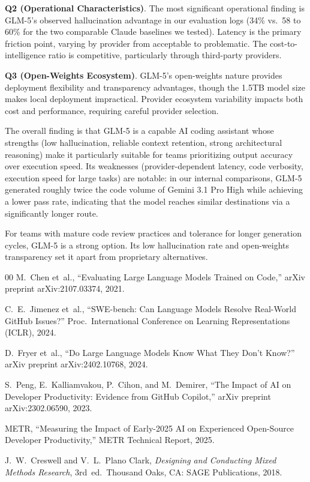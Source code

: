 \documentclass[conference]{IEEEtran}
\begin{document}
\textbf{Q2 (Operational Characteristics)}. The most significant operational finding is GLM-5's observed hallucination advantage in our evaluation logs (34\% vs.\ 58 to 60\% for the two comparable Claude baselines we tested). Latency is the primary friction point, varying by provider from acceptable to problematic. The cost-to-intelligence ratio is competitive, particularly through third-party providers.

\textbf{Q3 (Open-Weights Ecosystem)}. GLM-5's open-weights nature provides deployment flexibility and transparency advantages, though the 1.5TB model size makes local deployment impractical. Provider ecosystem variability impacts both cost and performance, requiring careful provider selection.

The overall finding is that GLM-5 is a capable AI coding assistant whose strengths (low hallucination, reliable context retention, strong architectural reasoning) make it particularly suitable for teams prioritizing output accuracy over execution speed. Its weaknesses (provider-dependent latency, code verbosity, execution speed for large tasks) are notable: in our internal comparisons, GLM-5 generated roughly twice the code volume of Gemini 3.1 Pro High while achieving a lower pass rate, indicating that the model reaches similar destinations via a significantly longer route.

For teams with mature code review practices and tolerance for longer generation cycles, GLM-5 is a strong option. Its low hallucination rate and open-weights transparency set it apart from proprietary alternatives.

\begin{thebibliography}{00}
\setlength{\itemsep}{-2pt}
M.~Chen et~al., ``Evaluating Large Language Models Trained on Code,'' arXiv preprint arXiv:2107.03374, 2021.

C.~E.~Jimenez et~al., ``SWE-bench: Can Language Models Resolve Real-World GitHub Issues?'' Proc.\ International Conference on Learning Representations (ICLR), 2024.

D.~Fryer et~al., ``Do Large Language Models Know What They Don't Know?'' arXiv preprint arXiv:2402.10768, 2024.

S.~Peng, E.~Kalliamvakou, P.~Cihon, and M.~Demirer, ``The Impact of AI on Developer Productivity: Evidence from GitHub Copilot,'' arXiv preprint arXiv:2302.06590, 2023.

METR, ``Measuring the Impact of Early-2025 AI on Experienced Open-Source Developer Productivity,'' METR Technical Report, 2025.

J.~W.~Creswell and V.~L.~Plano Clark, \textit{Designing and Conducting Mixed Methods Research}, 3rd~ed.\ Thousand Oaks, CA: SAGE Publications, 2018.


\end{thebibliography}
\end{document}
